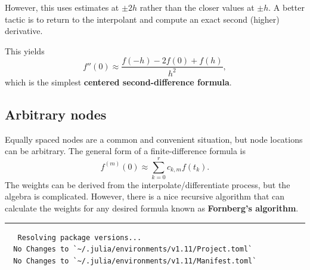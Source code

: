 \documentclass[
]{article}
\begin{document}
However, this uses estimates at \(\pm 2h\) rather than the closer values
at \(\pm h\). A better tactic is to return to the interpolant and
compute an exact second (higher) derivative.

This yields \[f''(0) \approx \frac{f(-h) - 2f(0) + f(h)}{h^2},\] which
is the simplest \textbf{centered second-difference formula}.

\subsection{Arbitrary nodes}\label{arbitrary-nodes}

Equally spaced nodes are a common and convenient situation, but node
locations can be arbitrary. The general form of a finite-difference
formula is \[f^{(m)}(0) \approx \sum_{k=0}^r c_{k,m} f(t_k).\] The
weights can be derived from the interpolate/differentiate process, but
the algebra is complicated. However, there is a nice recursive algorithm
that can calculate the weights for any desired formula known as
\textbf{Fornberg's algorithm}.

\begin{center}\rule{0.5\linewidth}{0.5pt}\end{center}

\begin{verbatim}
   Resolving package versions...
  No Changes to `~/.julia/environments/v1.11/Project.toml`
  No Changes to `~/.julia/environments/v1.11/Manifest.toml`
\end{verbatim}
\end{document}
